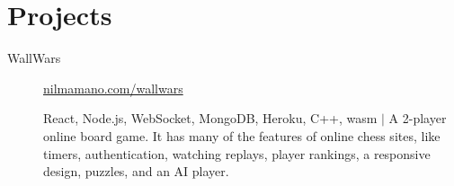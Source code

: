 \documentclass[letterpaper,10pt,oneside]{article}
\begin{document}
\section*{Projects}
\begin{description}
	\item[WallWars]\quad \href{http://nilmamano.com/wallwars/index.html}{nilmamano.com/wallwars} \hfill
	
	React, Node.js, WebSocket, MongoDB, Heroku, C++, wasm $|$ A 2-player online board game. It has many of the features of online chess sites, like timers, authentication, watching replays, player rankings, a responsive design, puzzles, and an AI player.

\begin{comment}
	 
	\item[SANA 2.0]\quad  \href{https://github.com/nmamano/SANA}{github.com/nmamano/SANA} \hfill Apr 2020 -- Jun 2020
	
	C++ $|$ Extended the SANA software (mentioned above) to enable alignment-finding between viruses. Refactored 20k+ lines of the codebase and added new features, allowing academic collaborators to run scientific experiments comparing SARS-CoV-2 to other viruses (currently underway).

	\item[ttl-cache]\quad  \href{https://github.com/nmamano/ttlcache}{github.com/nmamano/ttlcache}\hfill  Mar 2020
	
	C++ (templates and C++17 features) $|$ An efficient in-memory key-value cache that supports timeouts. It implements Redis' algorithm to remove expired entries and has an LRU eviction mechanism.
	
	\item[Graph Nearest-Neighbor]\quad  \href{https://github.com/nmamano/NearestNeighborInGraphs}{github.com/nmamano/NearestNeighborInGraphs} \hfill 2018
	 
	 Java $|$ Designed and implemented data structures for matching drivers and passengers on a road network dynamically. Leveraged the topology of road networks to optimize the data structures and scale them to statewide networks with 100k+ edges.  
	\item[Stable Matching Voronoi Diagram]\quad  \href{https://github.com/nmamano/StableMatchingVoronoiDiagram}{github.com/nmamano/StableMatchingVoronoiDiagram} \hfill 2018
	
	C++, OpenGL, Javascript $|$ Designed and implemented clustering algorithms for partitioning data into balanced clusters, and researched their application to gerrymandering prevention: they can partition a geographic region into compact and equal-population districts. Built a desktop application to visualize and benchmark the algorithms.
\end{comment}	
\begin{comment}
	\item[Chespel]\quad  \href{https://github.com/nmamano/Chespel}{github.com/nmamano/Chespel}\hfill 2014
	

\end{comment}
\end{description}
\end{document}
